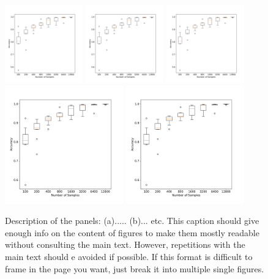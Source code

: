 \documentclass[prl,twocolumn]{revtex4-1}
\begin{document}
\begin{figure}[!tb]
  \centering
  \includegraphics[width=0.3\textwidth]{task_1/num_train_box.pdf}
  \hskip 1mm
  \includegraphics[width=0.3\textwidth]{task_1/num_train_box.pdf}
  \hskip 1mm
  \includegraphics[width=0.3\textwidth]{task_1/num_train_box.pdf}
  \vskip 1mm
  \includegraphics[width=0.455\textwidth]{task_1/num_train_box.pdf}
  \hskip 1mm
  \includegraphics[width=0.455\textwidth]{task_1/num_train_box.pdf}
  \caption{Description of the panels: (a)..... (b)... etc. This caption should give enough info on the content of figures to make them mostly readable without consulting the main text. However, repetitions with the main text should e avoided if possible. {\color{red} If this format is difficult to frame in the page you want, just break it into multiple single figures.}}
  \label{fig:x}
\end{figure}
\end{document}
